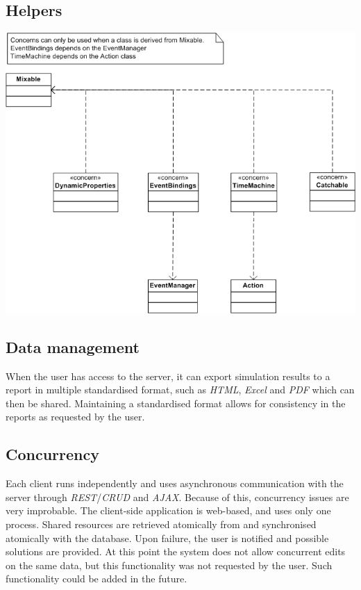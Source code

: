 \documentclass{report}
\begin{document}
				\subsection{Helpers}
					\includegraphics[scale=0.2]{helpers.png}
		
		\subsection{Data management}
			When the user has access to the server, it can export simulation results to a report in multiple standardised format, such as \emph{HTML}, \emph{Excel} and \emph{PDF} which can then be shared. Maintaining a standardised format allows for consistency in the reports as requested by the user.		
	
		\subsection{Concurrency}
			Each client runs independently and uses asynchronous communication with the server through \emph{REST}/\emph{CRUD} and \emph{AJAX}. Because of this, concurrency issues are very improbable. The client-side application is web-based, and uses only one process. Shared resources are retrieved atomically from and synchronised atomically with the database. Upon failure, the user is notified and possible solutions are provided. At this point the system does not allow concurrent edits on the same data, but this functionality was not requested by the user. Such functionality could be added in the future.\\		
			
\end{document}
